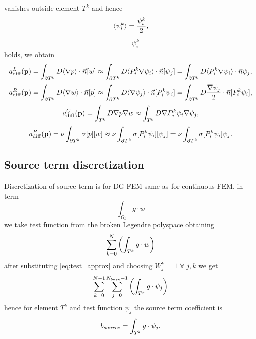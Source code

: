 vanishes outside element $T^k$ and hence
\begin{eqnarray}
	\langle\psi^k_i\rangle = \frac{\psi^k_i}{2},
\end{eqnarray}
\begin{eqnarray}
    [\psi^k_i] = \psi^k_i
\end{eqnarray}
holds, we obtain
\begin{equation}\label{eq:diff_left_approx}
	a^L_\mathrm{diff}(\mathbf{p}) = \int_{\partial T^k} D \langle\nabla p\rangle \cdot \vec{n} [w] 
	\approx
		\int_{\partial T^k} D \langle P^k_i\nabla\psi_i\rangle \cdot \vec{n}[\psi_j] =
		\int_{\partial T^k} D \langle P^k_i\nabla\psi_i\rangle \cdot \vec{n}\psi_j,
\end{equation}
\begin{equation}\label{eq:diff_right_approx}
		a^R_\mathrm{diff}(\mathbf{p}) =\int_{\partial T^k} D \langle\nabla w \rangle\cdot \vec{n} [p] 
		\approx
			\int_{\partial T^k} D \langle\nabla \psi_j \rangle\cdot \vec{n} [P^k_i\psi_i] =
			\int_{\partial T^k} D \frac{\nabla \psi_j}{2}\cdot \vec{n} 
			[P^k_i\psi_i],
\end{equation}\label{eq:diff_laplace_approx}
\begin{equation}\label{key}
	a^C_\mathrm{diff}(\mathbf{p})=\int_{T^k} D\nabla p \nabla w \approx
		\int_{T^k} D\nabla P^k_i\psi_i \nabla \psi_j,
\end{equation}
\begin{equation}\label{eq:diff_penalty_approx}
		a^P_\mathrm{diff}(\mathbf{p})=\nu \int_{\partial T^k} \sigma [p][w] \approx
	 	\nu \int_{\partial T^k} \sigma [P^k_i\psi_i][\psi_j] 
	 	= \nu \int_{\partial T^k} \sigma [P^k_i\psi_i]\psi_j.
\end{equation}


\subsection{Source term discretization}
\label{se:source_term}
Discretization of source term is for DG FEM same as for continuous FEM, 
in term
\begin{equation}
	\int_{\Omega_h} g\cdot w
\end{equation}
we take test function from the broken Legendre polyspace obtaining 
\begin{equation}
	\sum\limits_{k=0}^{N}\left(\int_{T^k} g\cdot w\right)
\end{equation}
after substituting \eqref{eq:test_approx} and choosing $W_j^k = 1 \; \forall \; 
j, k$ we get
\begin{equation}
\sum\limits_{k=0}^{N - 1}\sum\limits_{j=0}^{N_{base} - 1}\left(\int_{T^k} g\cdot 
\psi_j \right)
\end{equation}
hence for element $T^k$ and test function $\psi_j$ the source term coefficient 
is
\begin{equation}
	b_{source} = \int_{T^k} g\cdot \psi_j.
\end{equation}

